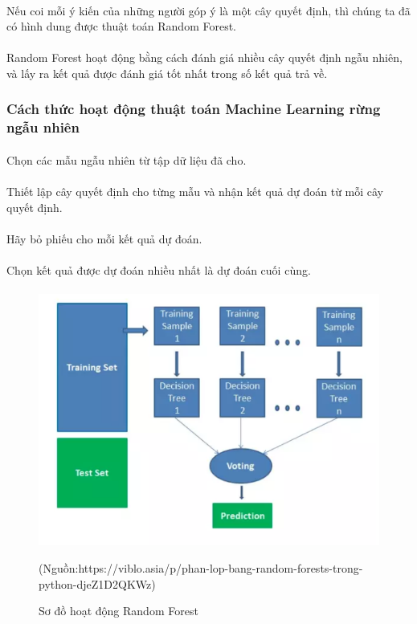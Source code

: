 \documentclass{article}
\begin{document}
\paragraph{}
Nếu coi mỗi ý kiến của những người góp ý là một cây quyết định, thì chúng ta đã có hình dung được thuật toán Random Forest.
\paragraph{}
Random Forest hoạt động bằng cách đánh giá nhiều cây quyết định ngẫu nhiên, và lấy ra kết quả được đánh giá tốt nhất trong số kết quả trả về.
\subsubsection{Cách thức hoạt động thuật toán Machine Learning rừng ngẫu nhiên}
\paragraph{}Chọn các mẫu ngẫu nhiên từ tập dữ liệu đã cho.
\paragraph{}Thiết lập cây quyết định cho từng mẫu và nhận kết quả dự đoán từ mỗi cây quyết định.
\paragraph{}Hãy bỏ phiếu cho mỗi kết quả dự đoán.
\paragraph{}Chọn kết quả được dự đoán nhiều nhất là dự đoán cuối cùng.
\paragraph{}
\begin{figure}[!h]
	\begin{center}
		\includegraphics[width=\linewidth]{images/RandomForest.png}
		\caption{\fontsize{14}{20}\selectfont Sơ đồ hoạt động Random Forest}
		(Nguồn:https://viblo.asia/p/phan-lop-bang-random-forests-trong-python-djeZ1D2QKWz)
	\end{center}
\end{figure}
\end{document}
